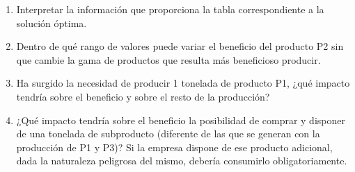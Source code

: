 \begin{enumerate}
    \item Interpretar la información que proporciona la tabla correspondiente a la solución óptima.

    \item Dentro de qué rango de valores puede variar el beneficio del producto P2 sin que cambie la gama de productos que resulta más beneficioso producir.
    
    \item Ha surgido la necesidad de producir 1 tonelada de producto P1, ¿qué impacto tendría sobre el beneficio y sobre el resto de la producción?
        
    \item ¿Qué impacto tendría sobre el beneficio la posibilidad de comprar y disponer de una tonelada de subproducto (diferente de las que se generan con la producción de P1 y P3)? Si la empresa dispone de ese producto adicional, dada la naturaleza peligrosa del mismo, debería consumirlo obligatoriamente.

    
\end{enumerate}






